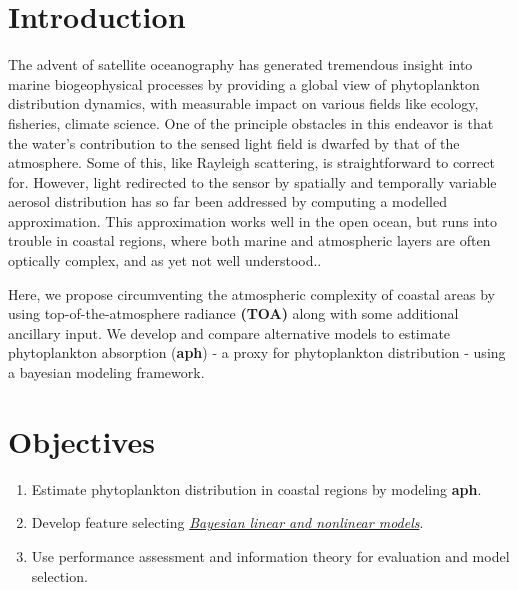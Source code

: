 \documentclass[a0,portrait]{a0poster}
\begin{document}
\begin{multicols}{2}

\color{SaddleBrown} %

\section*{Introduction}

The advent of satellite oceanography has generated tremendous insight into marine biogeophysical processes by providing a global view of phytoplankton distribution dynamics, with measurable impact on various fields like ecology, fisheries, climate science. One of the principle obstacles in this endeavor is that the water's contribution to the sensed light field is dwarfed by that of the atmosphere. Some of this, like Rayleigh scattering, is straightforward to correct for. However, light redirected to the sensor by spatially and temporally variable aerosol distribution has so far been addressed by computing a modelled approximation. This approximation works well in the open ocean, but runs into trouble in coastal regions, where both marine and atmospheric layers are often optically complex, and as yet not well understood.. 

Here, we propose circumventing the atmospheric complexity of coastal areas by using top-of-the-atmosphere radiance \textbf{(TOA)} along with some additional ancillary input. We develop and compare alternative models to estimate phytoplankton absorption (\textbf{aph}) - a proxy for phytoplankton distribution - using a bayesian modeling framework.
\color{Black} 

\section*{Objectives}

\begin{enumerate}
    \item Estimate phytoplankton distribution in coastal regions by modeling \textbf{aph}.
    \item Develop feature selecting \underline{\emph{Bayesian linear and nonlinear models}}.
    \item Use performance assessment and information theory for evaluation and model selection.
\end{enumerate}
\color{DarkSlateGray} 


\end{multicols}
\end{document}
